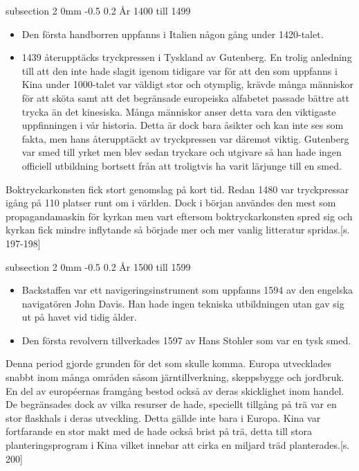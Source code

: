 \documentclass[a4paper,12pt]{article}
\makeatletter
\renewcommand{\subsection}{\@startsection
   {subsection}%
   {2}%
   {0mm}%
   {-0.5\baselineskip}%
   {0.2\baselineskip}%
   {\rmfamily\normalfont\slshape\normalsize}}%
\makeatother
\begin{document}
\subsection{År 1400 till 1499}
\begin{itemize}
\item Den första handborren uppfanns i Italien någon gång under 1420-talet.\cite{brace}

\item 1439 återupptäcks tryckpressen i Tyskland av Gutenberg.\cite{gutenberg2} En trolig anledning till att den inte hade slagit igenom tidigare var för att den som uppfanns i Kina under 1000-talet var väldigt stor och otymplig, krävde många människor för att sköta samt att det begränsade europeiska alfabetet passade bättre att trycka än det kinesiska. Många människor anser detta vara den viktigaste uppfinningen i vår historia.\cite{gutenberg}\cite{gutenberg1} Detta är dock bara åsikter och kan inte ses som fakta, men hans återupptäckt av tryckpressen var däremot viktig. Gutenberg var smed till yrket men blev sedan tryckare och utgivare så han hade ingen officiell utbildning bortsett från att troligtvis ha varit lärjunge till en smed.
\end{itemize}
Boktryckarkonsten fick stort genomslag på kort tid. Redan 1480 var tryckpressar igång på 110 platser runt om i världen. Dock i början användes den mest som propagandamaskin för kyrkan men vart eftersom boktryckarkonsten spred sig och kyrkan fick mindre inflytande så började mer och mer vanlig litteratur spridas.\cite{hansson}[s. 197-198]


\subsection{År 1500 till 1599}
\begin{itemize}
\item Backstaffen var ett navigeringsinstrument som uppfanns 1594 av den engelska navigatören John Davis.\cite{backstaff} Han hade ingen tekniska utbildningen utan gav sig ut på havet vid tidig ålder.

\item Den första revolvern tillverkades 1597 av Hans Stohler som var en tysk smed. \cite{revolver}
\end{itemize}
Denna period gjorde grunden för det som skulle komma. Europa utvecklades snabbt inom många områden såsom järntillverkning, skeppsbygge och jordbruk. En del av européernas framgång bestod också av deras skicklighet inom handel. De begränsades dock av vilka resurser de hade, speciellt tillgång på trä var en stor flaskhals i deras utveckling. Detta gällde inte bara i Europa. Kina var fortfarande en stor makt med de hade också brist på trä, detta till stora planteringsprogram i Kina vilket innebar att cirka en miljard träd planterades.\cite{hansson}[s. 200]
\end{document}
